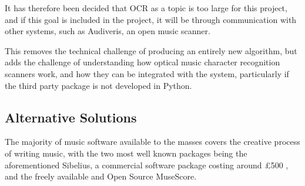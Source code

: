 It has therefore been decided that OCR as a topic is too large for this project, and if this goal is included in the project, it will be through communication with other systems, such as Audiveris, an open music scanner\parencite{audiveris}. 

This removes the technical challenge of producing an entirely new algorithm, but adds the challenge of understanding how optical music character recognition scanners work, and how they can be integrated with the system, particularly if the third party package is not developed in Python.

\subsection{Alternative Solutions}
The majority of music software available to the masses covers the creative process of writing music, with the two most well known packages being the aforementioned Sibelius, a commercial software package costing around £500 \parencite{avid}, and the freely available and Open Source MuseScore\parencite{MuseTour}.